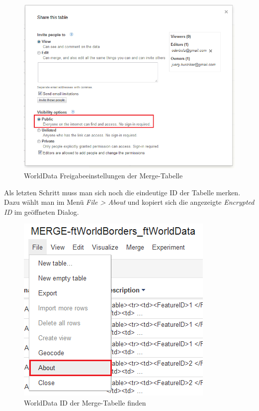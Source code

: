 \begin{figure}[H]
	\centering
	\includegraphics[scale=0.5]{images/usecase1-worlddata/documentation/worlddata-prepare_fusiontableslayer2.png}
	\caption{WorldData Freigabeeinstellungen der Merge-Tabelle}
	\label{worlddata-prepare_fusiontableslayer2}
\end{figure}

Als letzten Schritt muss man sich noch die eindeutige ID der Tabelle merken. Dazu wählt man im Menü  \emph{File > About} und kopiert sich die angezeigte \emph{Encrypted ID} im geöffneten Dialog.

\begin{figure}[H]
	\centering
	\includegraphics[scale=0.7]{images/usecase1-worlddata/documentation/worlddata-prepare_fusiontableslayer3.png}
	\caption{WorldData ID der Merge-Tabelle finden}
	\label{worlddata-prepare_fusiontableslayer3}
\end{figure}

